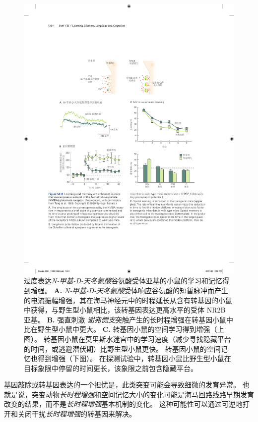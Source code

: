 \begin{figure}[htbp]
	\centering
	\includegraphics[width=0.9\linewidth]{chap54/fig_54_8}
	\caption{过度表达\textit{N-甲基-D-天冬氨酸}谷氨酸受体亚基的小鼠的学习和记忆得到增强。
		\textbf{A.} \textit{N-甲基-D-天冬氨酸}受体响应谷氨酸的短暂脉冲而产生的电流振幅增强，其在海马神经元中的时程延长从含有转基因的小鼠中获得，与野生型小鼠相比，该转基因表达更高水平的受体 NR2B 亚基。
		\textbf{B.} 强直刺激 \textit{谢弗侧支}突触产生的长时程增强在转基因小鼠中比在野生型小鼠中更大。
		\textbf{C.} 转基因小鼠的空间学习得到增强（上图）。
		转基因小鼠在莫里斯水迷宫中的学习速度（减少寻找隐藏平台的时间，或逃避潜伏期）比野生型小鼠更快。
		转基因小鼠的空间记忆也得到增强（下图）。
		在探测试验中，转基因小鼠比野生型小鼠在目标象限中停留的时间更长，该象限之前包含隐藏平台。}
	\label{fig:54_8}
\end{figure}


基因敲除或转基因表达的一个担忧是，此类突变可能会导致细微的发育异常。
也就是说，突变动物\textit{长时程增强}和空间记忆大小的变化可能是海马回路线路早期发育改变的结果，而不是\textit{长时程增强}基本机制的变化。
这种可能性可以通过可逆地打开和关闭干扰\textit{长时程增强}的转基因来解决。


